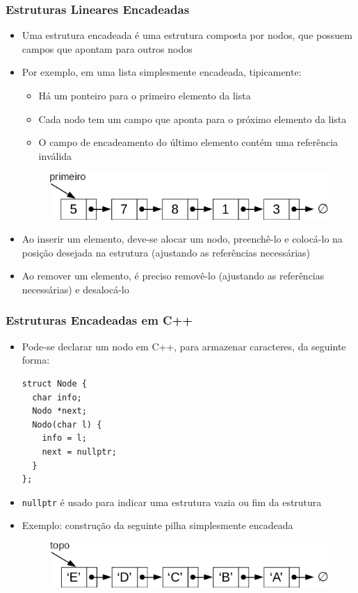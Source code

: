 \documentclass[aspectratio=169]{beamer}
\begin{document}
\begin{frame}\frametitle{Estruturas Lineares Encadeadas}
\begin{itemize}
	\item Uma estrutura encadeada é uma estrutura composta por nodos, que possuem campos que apontam para outros nodos
	\item Por exemplo, em uma lista simplesmente encadeada, tipicamente:
	\begin{itemize}
		\item Há um ponteiro para o primeiro elemento da lista
		\item Cada nodo tem um campo que aponta para o próximo elemento da lista
		\item O campo de encadeamento do último elemento contém uma referência inválida
	\end{itemize}
\begin{figure}[h]
	\centering
	\includegraphics[height=0.15\paperheight]{imagens/lista_simplesmente_encadeada2.png}
\end{figure}
	\item Ao inserir um elemento, deve-se alocar um nodo, preenchê-lo e colocá-lo na posição desejada na estrutura (ajustando as referências necessárias)
	\item Ao remover um elemento, é preciso removê-lo (ajustando as referências necessárias) e desalocá-lo
\end{itemize}
\end{frame}

\begin{frame}[fragile]\frametitle{Estruturas Encadeadas em C++}
\begin{itemize}
	\item Pode-se declarar um nodo em C++, para armazenar caracteres, da seguinte forma:
\begin{lstlisting}[basicstyle=\ttfamily\scriptsize]
struct Node {
  char info;
  Nodo *next;
  Nodo(char l) {
    info = l;
    next = nullptr;
  }
};
\end{lstlisting}
	\item \texttt{nullptr} é usado para indicar uma estrutura vazia ou fim da estrutura
	\item Exemplo: construção da seguinte pilha simplesmente encadeada
\begin{figure}[h]
	\centering
	\includegraphics[height=0.15\paperheight]{imagens/pilha_simplesmente_encadeada.png}
\end{figure}
\end{itemize}
\end{frame}
\end{document}
